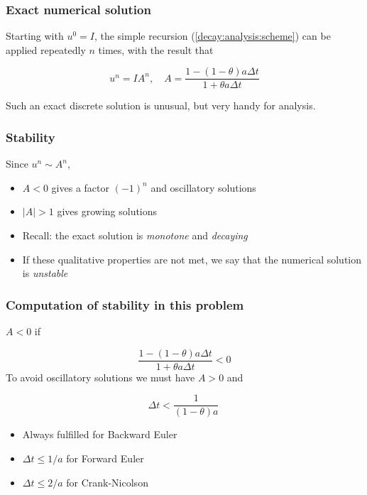 \documentclass{beamer}
\begin{document}
\begin{frame}
\frametitle{Exact numerical solution}

Starting with $u^0=I$, the simple recursion (\ref{decay:analysis:scheme})
can be applied repeatedly $n$ times, with the result that

\begin{equation}
u^{n} = IA^n,\quad A = \frac{1 - (1-\theta) a\Delta t}{1 + \theta a\Delta t}
\label{decay:analysis:unex}
\end{equation}

Such an exact discrete solution is unusual, but very handy for analysis.
\end{frame}

\begin{frame}
\frametitle{Stability}


Since $u^n\sim A^n$,

\begin{itemize}
 \item $A < 0$ gives a factor $(-1)^n$ and oscillatory solutions

 \item $|A|>1$ gives growing solutions

 \item Recall: the exact solution is \emph{monotone} and \emph{decaying}

 \item If these qualitative properties are not met, we say that the
   numerical solution is \emph{unstable}
\end{itemize}

\noindent
\end{frame}

\begin{frame}
\frametitle{Computation of stability in this problem}

$A < 0$ if

\[
\frac{1 - (1-\theta) a\Delta t}{1 + \theta a\Delta t} < 0
\]
To avoid oscillatory solutions we must have $A> 0$ and

\begin{equation}
\Delta t < \frac{1}{(1-\theta)a}\ 
\end{equation}

\begin{itemize}
 \item Always fulfilled for Backward Euler

 \item $\Delta t \leq 1/a$ for Forward Euler

 \item $\Delta t \leq 2/a$ for Crank-Nicolson
\end{itemize}

\noindent
\end{frame}
\end{document}
